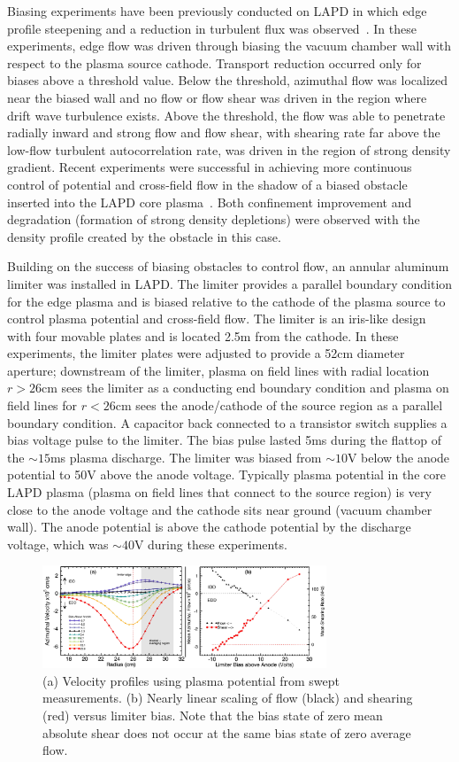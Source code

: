 \documentclass[aps,prl,amsmath,amssymb,preprint,superscriptaddress]{revtex4}
\begin{document}
Biasing experiments have been previously conducted on LAPD in which
edge profile steepening and a reduction in turbulent flux was
observed~\cite{maggs07,carter09}. In these experiments, edge flow was
driven through biasing the vacuum chamber wall with respect to the
plasma source cathode.  Transport reduction occurred only for biases
above a threshold value.  Below the threshold, azimuthal flow was
localized near the biased wall and no flow or flow shear was driven in
the region where drift wave turbulence exists.  Above the threshold,
the flow was able to penetrate radially inward and strong flow and
flow shear, with shearing rate far above the low-flow turbulent
autocorrelation rate, was driven in the region of strong density
gradient.   Recent experiments were successful in achieving more continuous control of potential and cross-field flow in the shadow of a biased obstacle inserted into the LAPD core plasma~\cite{zhou12}.  Both confinement improvement and degradation (formation of strong density depletions) were observed with the density profile created by the obstacle in this case.  

Building on the success of biasing obstacles to control flow, an
annular aluminum limiter was installed in LAPD. The limiter provides a parallel boundary condition for the edge plasma and is biased relative to the cathode of the plasma source to control plasma potential and cross-field flow.  The limiter is
an iris-like design with four movable plates and is located 2.5m from
the cathode.  In these experiments, the limiter plates were adjusted
to provide a 52cm diameter aperture; downstream of the
limiter, plasma on field lines with radial location $r>26$cm sees the
limiter as a conducting end boundary condition and plasma on field
lines for $r<26$cm sees the anode/cathode of the source region as a
parallel boundary condition.  A capacitor back connected to a transistor switch supplies a bias voltage pulse to the limiter.  The
bias pulse lasted 5ms during the flattop of the $\sim 15$ms plasma
discharge. The limiter was biased from $\sim 10$V below the anode
potential to 50V above the anode voltage.  Typically plasma potential
in the core LAPD plasma (plasma on field lines that connect to the
source region) is very close to the anode voltage and the cathode sits
near ground (vacuum chamber wall).  The anode potential is above the
cathode potential by the discharge voltage, which was $\sim 40$V during these experiments.

\begin{figure}[!htbp]
\centerline{
\includegraphics[width=8.5cm]{velocity_flowshear.pdf}}
\caption{\label{fig:velocity_flowshear} (a) Velocity profiles using plasma potential from swept measurements. (b) Nearly linear scaling of flow (black) and shearing (red) versus limiter bias. Note that the bias state of zero mean absolute shear does not occur at the same bias state of zero average flow.}
\end{figure}
\end{document}
